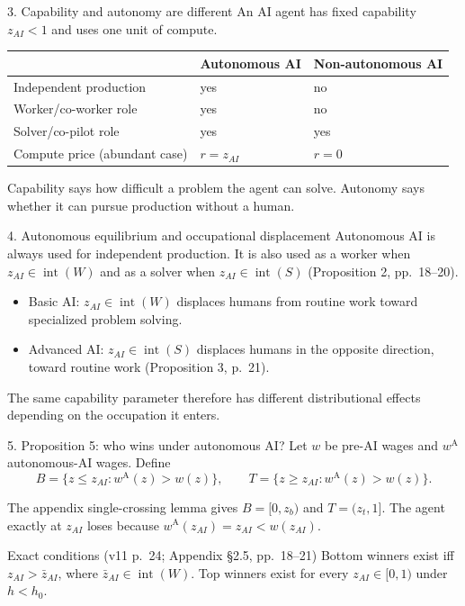\documentclass[aspectratio=169,11pt]{beamer}
\newcommand{\A}{\mathrm{A}}
\begin{document}
\begin{frame}{3. Capability and autonomy are different}
An AI agent has fixed capability $z_{AI}<1$ and uses one unit of compute.

\begin{center}
\begin{tabular}{lll}
\toprule
 & Autonomous AI & Non-autonomous AI\\
\midrule
Independent production & yes & no\\
Worker/co-worker role & yes & no\\
Solver/co-pilot role & yes & yes\\
Compute price (abundant case) & $r=z_{AI}$ & $r=0$\\
\bottomrule
\end{tabular}
\end{center}

\medskip
Capability says how difficult a problem the agent can solve. Autonomy says
whether it can pursue production without a human.
\end{frame}

\begin{frame}{4. Autonomous equilibrium and occupational displacement}
Autonomous AI is always used for independent production. It is also used as a
worker when $z_{AI}\in\operatorname{int}(W)$ and as a solver when
$z_{AI}\in\operatorname{int}(S)$ (Proposition 2, pp.~18--20).

\medskip
\begin{itemize}
\item Basic AI: $z_{AI}\in\operatorname{int}(W)$ displaces humans from routine
      work toward specialized problem solving.
\item Advanced AI: $z_{AI}\in\operatorname{int}(S)$ displaces humans in the
      opposite direction, toward routine work (Proposition 3, p.~21).
\end{itemize}

The same capability parameter therefore has different distributional effects
depending on the occupation it enters.
\end{frame}

\begin{frame}{5. Proposition 5: who wins under autonomous AI?}
Let $w$ be pre-AI wages and $w^\A$ autonomous-AI wages. Define
\[
B=\{z\le z_{AI}:w^\A(z)>w(z)\},\qquad
T=\{z\ge z_{AI}:w^\A(z)>w(z)\}.
\]

The appendix single-crossing lemma gives
$B=[0,z_b)$ and $T=(z_t,1]$. The agent exactly at $z_{AI}$ loses because
$w^\A(z_{AI})=z_{AI}<w(z_{AI})$.

\begin{block}{Exact conditions (v11 p.~24; Appendix \S2.5, pp.~18--21)}
Bottom winners exist iff $z_{AI}>\bar z_{AI}$, where
$\bar z_{AI}\in\operatorname{int}(W)$. Top winners exist for every
$z_{AI}\in[0,1)$ under $h<h_0$.
\end{block}
\end{frame}
\end{document}
